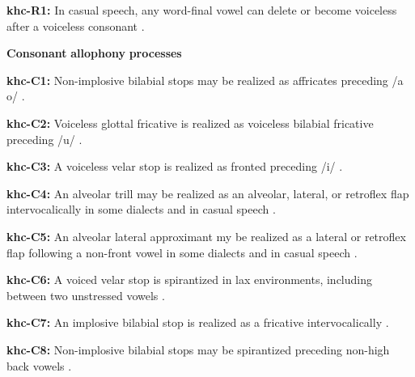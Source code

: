 \begin{styleBody}
\textbf{khc-R1:} In casual speech, any word-final vowel can delete or become voiceless after a voiceless consonant \citep[23]{Donohue1999}.
\end{styleBody}

\begin{styleBody}
\textbf{Consonant} \textbf{allophony} \textbf{processes}
\end{styleBody}

\begin{styleBody}
\textbf{khc-C1:} Non-implosive bilabial stops may be realized as affricates preceding /a o/ \citep[16]{Donohue1999}.
\end{styleBody}

\begin{styleBody}
\textbf{khc-C2:} Voiceless glottal fricative is realized as voiceless bilabial fricative preceding /u/ \citep[19]{Donohue1999}.
\end{styleBody}

\begin{styleBody}
\textbf{khc-C3:} A voiceless velar stop is realized as fronted preceding /i/ \citep[19]{Donohue1999}.
\end{styleBody}

\begin{styleBody}
\textbf{khc-C4:} An alveolar trill may be realized as an alveolar, lateral, or retroflex flap intervocalically in some dialects and in casual speech \citep[18]{Donohue1999}.
\end{styleBody}

\begin{styleBody}
\textbf{khc-C5:} An alveolar lateral approximant my be realized as a lateral or retroflex flap following a non-front vowel in some dialects and in casual speech \citep[18]{Donohue1999}.
\end{styleBody}

\begin{styleBody}
\textbf{khc-C6:} A voiced velar stop is spirantized in lax environments, including between two unstressed vowels \citep[27]{Donohue1999}.
\end{styleBody}

\begin{styleBody}
\textbf{khc-C7:} An implosive bilabial stop is realized as a fricative intervocalically \citep[16]{Donohue1999}.
\end{styleBody}

\begin{styleBody}
\textbf{khc-C8:} Non-implosive bilabial stops may be spirantized preceding non-high back vowels \citep[16]{Donohue1999}.
\end{styleBody}

